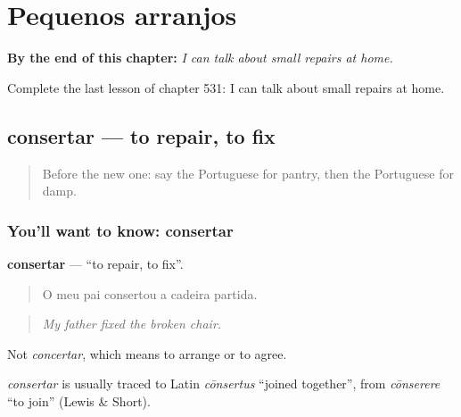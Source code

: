 
\chapter{Pequenos arranjos}
\label{ch:pt-pequenos-arranjos}

\begin{chapteropening}
\textbf{By the end of this chapter:} \emph{I can talk about small repairs at home.}

Complete the last lesson of chapter 531: I can talk about small repairs at home.
\end{chapteropening}

\section[consertar]{consertar — to repair, to fix}

\label{lesson:PT-C531-consertar}



\begin{quote}
Before the new one: say the Portuguese for pantry, then the Portuguese for damp.
\end{quote}

\subsection*{You'll want to know: consertar}
\textbf{consertar} — \textquotedblleft{}to repair, to fix\textquotedblright{}.

\begin{quote}
O meu pai consertou a cadeira partida.
\end{quote}

\begin{quote}
\emph{My father fixed the broken chair.}
\end{quote}

Not \emph{concertar}, which means to arrange or to agree.

\begin{cousinweb}
\emph{consertar} is usually traced to Latin \emph{cōnsertus} \textquotedblleft{}joined together\textquotedblright{}, from \emph{cōnserere} \textquotedblleft{}to join\textquotedblright{} (Lewis \& Short).
\end{cousinweb}

